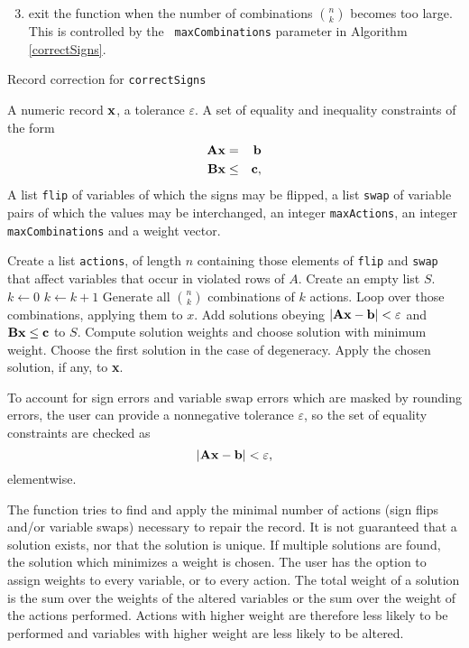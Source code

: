 \documentclass[11pt, fleqn, a4paper]{article}
\begin{document}
\begin{enumerate}
\setcounter{enumi}{2}
\item exit the function when the number of combinations ${ n \choose k}$ becomes too large. This is controlled by the {\tt
maxCombinations} parameter in Algorithm \ref{correctSigns}.
\end{enumerate}
%
%
\begin{algorithm}[t]
\caption{Record correction for {\tt correctSigns}}
\label{correctSigns}
\begin{algorithmic}[1]
\Require A numeric record $\bf x$, a tolerance $\varepsilon$. A set of equality and
    inequality constraints of the form
\begin{eqnarray*}
{\bf Ax} &=& {\bf b}\\
{\bf Bx} &\leq& {\bf c},
\end{eqnarray*}
A list {\tt flip} of variables of which the signs may be flipped, a list {\tt swap} of
variable pairs of which the values may be interchanged, an integer {\tt maxActions}, an
integer {\tt maxCombinations} and a weight vector.

\State Create a list {\tt actions}, of length $n$ containing those elements of {\tt flip} and {\tt swap} that
    affect variables that occur in violated rows of $A$.
\State Create an empty list $S$.
\State $k\leftarrow 0$
   \State $k\leftarrow k+1$ 
   \State Generate all ${n\choose k}$ combinations of $k$ actions.
   \State Loop over those combinations, applying them to $x$. Add solutions
obeying $|{\bf Ax-b}|<\varepsilon$ and ${\bf Bx}\leq{\bf c}$ to $S$.
  \EndIf
\EndWhile
{}
\State Compute solution weights and choose solution with minimum weight. Choose
the first solution in the case of degeneracy.
\EndIf
\State Apply the chosen solution, if any, to {\bf x}.
\end{algorithmic}
\end{algorithm}

To account for sign errors and variable swap errors which are masked by
rounding errors, the user can provide a nonnegative tolerance $\varepsilon$, so
the set of equality constraints are checked as
\begin{equation}
|{\bf Ax -b}| < \varepsilon,
\end{equation}
elementwise.

The function tries to find and apply the minimal number of actions (sign flips
and/or variable swaps) necessary to repair the record. It is not guaranteed
that a solution exists, nor that the solution is unique. If multiple solutions
are found, the solution which minimizes a weight is chosen.  The user has the
option to assign weights to every variable, or to every action.  The total
weight of a solution is the sum over the weights of the altered variables or
the sum over the weight of the actions performed. Actions with higher weight
are therefore less likely to be performed and variables with higher weight are
less likely to be altered.
\end{document}
